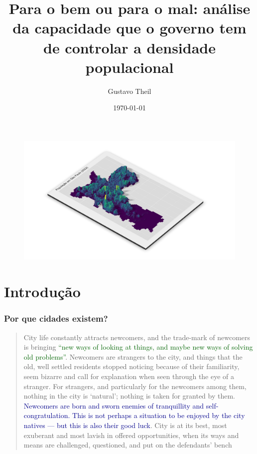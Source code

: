 \documentclass[%
    8pt, 
    aspectratio=169,
]{beamer}
\title{Para o bem ou para o mal: \newline análise da capacidade que o governo tem de controlar a densidade populacional}
\author{Gustavo Theil}
\date{\today}
\begin{document}
\begin{frame}[plain]{}
    \begin{figure}
        \includegraphics[width = \paperwidth, height = \paperheight]{imagens/mapa3d.png}
    \end{figure}
\end{frame}

\frame{\titlepage}


\section{Introdução}

\begin{frame}
    \frametitle{Por que cidades existem?}
    \begin{quote}
        City life constantly attracts newcomers, and the trade-mark of newcomers is bringing \textcolor{DarkGreen}{``new ways of looking at things, and maybe new ways of solving old problems''}. Newcomers are strangers to the city, and things that the old, well settled residents stopped noticing because of their familiarity, seem bizarre and call for explanation when seen through the eye of a stranger. For strangers, and particularly for the newcomers among them, nothing in the city is `natural'; nothing is taken for granted by them. \textcolor{DarkBlue}{Newcomers are born and sworn enemies of tranquillity and self-congratulation. This is not perhaps a situation to be enjoyed by the city natives --- but this is also their good luck}. City is at its best, most exuberant and most lavish in offered opportunities, when its ways and means are challenged, questioned, and put on the defendants' bench

    \end{quote}
\end{frame}
\end{document}

